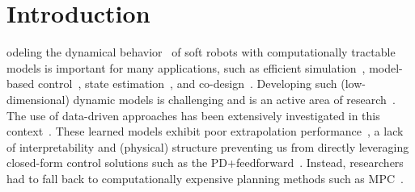 \section{Introduction}
odeling the dynamical behavior~\cite{armanini2023soft} of soft robots with computationally tractable models is important for many applications, such as efficient simulation~\cite{alkayas2025soft}, model-based control~\cite{della2023model}, state estimation~\cite{shao2023model}, and co-design~\cite{wang2024diffusebot}. 
%
% 
Developing such (low-dimensional) dynamic models is challenging and is an active area of research~\cite{alora2023data, armanini2023soft}. The use of data-driven approaches has been extensively investigated in this context~\cite{thuruthel2017learning, bruder2020data, alora2023data, chen2024data}.
These learned models exhibit poor extrapolation performance~\cite{kim2021review}, a lack of interpretability and (physical) structure preventing us from directly leveraging closed-form control solutions such as the PD+feedforward~\cite{della2023model}. Instead, researchers had to fall back to computationally expensive planning methods such as \gls{MPC}~\cite{bruder2020data, alora2023data}.

